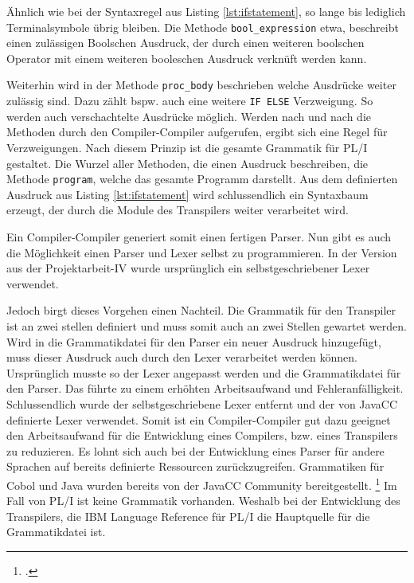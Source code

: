 Ähnlich wie bei der Syntaxregel aus Listing \ref{lst:ifstatement}, so lange bis lediglich Terminalsymbole übrig bleiben.
Die Methode \verb+bool_expression+ etwa, beschreibt einen zulässigen Boolschen Ausdruck, der durch einen weiteren boolschen Operator mit einem weiteren booleschen Ausdruck verknüft werden kann.

Weiterhin wird in der Methode \verb+proc_body+ beschrieben welche Ausdrücke weiter zulässig sind. Dazu zählt bspw. auch eine weitere \verb+IF ELSE+ Verzweigung. So werden auch verschachtelte Ausdrücke möglich.
Werden nach und nach die Methoden durch den Compiler-Compiler aufgerufen, ergibt sich eine Regel für Verzweigungen. Nach diesem Prinzip ist die gesamte Grammatik für PL/I gestaltet. 
Die Wurzel aller Methoden, die einen Ausdruck beschreiben, die Methode \verb+program+, welche das gesamte Programm darstellt.
Aus dem definierten Ausdruck aus Listing \ref{lst:ifstatement} wird schlussendlich ein Syntaxbaum erzeugt, der durch die Module des Transpilers weiter verarbeitet wird.


Ein Compiler-Compiler generiert somit einen fertigen Parser. Nun gibt es auch die Möglichkeit einen Parser und Lexer selbst zu programmieren. In der Version aus der Projektarbeit-IV wurde ursprünglich ein selbstgeschriebener Lexer verwendet.

Jedoch birgt dieses Vorgehen einen Nachteil. Die Grammatik für den Transpiler ist an zwei stellen definiert und muss somit auch an zwei Stellen gewartet werden.
Wird in die Grammatikdatei für den Parser ein neuer Ausdruck hinzugefügt, muss dieser Ausdruck auch durch den Lexer verarbeitet werden können.
Ursprünglich musste so der Lexer angepasst werden und die Grammatikdatei für den Parser. 
Das führte zu einem erhöhten Arbeitsaufwand und Fehleranfälligkeit. Schlussendlich wurde der selbstgeschriebene Lexer entfernt und der von JavaCC definierte Lexer verwendet.
Somit ist ein Compiler-Compiler gut dazu geeignet den Arbeitsaufwand für die Entwicklung eines Compilers, bzw. eines Transpilers zu reduzieren. 
Es lohnt sich auch bei der Entwicklung eines Parser für andere Sprachen auf bereits definierte Ressourcen zurückzugreifen. 
Grammatiken für Cobol und Java wurden bereits von der JavaCC Community bereitgestellt. \footcite[Vgl. ][]{javaccdoku}
Im Fall von PL/I ist keine Grammatik vorhanden. Weshalb bei der Entwicklung des Transpilers, die IBM Language Reference für PL/I die Hauptquelle für die Grammatikdatei ist.   

